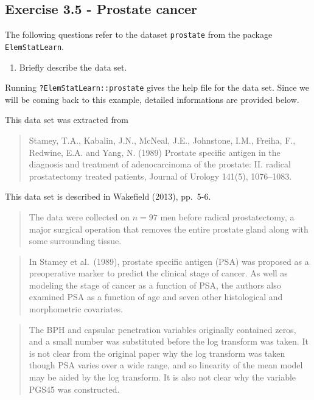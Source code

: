 \documentclass[]{book}
\providecommand{\tightlist}{%
  \setlength{\itemsep}{0pt}\setlength{\parskip}{0pt}}
\theoremstyle{definition}
\theoremstyle{definition}
\theoremstyle{definition}
\theoremstyle{remark}
\begin{document}
\hypertarget{exercise-3.5---prostate-cancer}{%
\subsection{Exercise 3.5 - Prostate
cancer}\label{exercise-3.5---prostate-cancer}}

The following questions refer to the dataset \texttt{prostate} from the
package \texttt{ElemStatLearn}.

\begin{enumerate}
\def\labelenumi{\alph{enumi}.}
\tightlist
\item
  Briefly describe the data set.
\end{enumerate}

Running \texttt{?ElemStatLearn::prostate} gives the help file for the
data set. Since we will be coming back to this example, detailed
informations are provided below.

This data set was extracted from

\begin{quote}
Stamey, T.A., Kabalin, J.N., McNeal, J.E., Johnstone, I.M., Freiha, F.,
Redwine, E.A. and Yang, N. (1989) Prostate specific antigen in the
diagnosis and treatment of adenocarcinoma of the prostate: II. radical
prostatectomy treated patients, Journal of Urology 141(5), 1076--1083.
\end{quote}

This data set is described in Wakefield (2013), pp.~5-6.

\begin{quote}
The data were collected on \(n=97\) men before radical prostatectomy, a
major surgical operation that removes the entire prostate gland along
with some surrounding tissue.
\end{quote}

\begin{quote}
In Stamey et al.~(1989), prostate specific antigen (PSA) was proposed as
a preoperative marker to predict the clinical stage of cancer. As well
as modeling the stage of cancer as a function of PSA, the authors also
examined PSA as a function of age and seven other histological and
morphometric covariates.
\end{quote}

\begin{quote}
The BPH and capsular penetration variables originally contained zeros,
and a small number was substituted before the log transform was taken.
It is not clear from the original paper why the log transform was taken
though PSA varies over a wide range, and so linearity of the mean model
may be aided by the log transform. It is also not clear why the variable
PGS45 was constructed.
\end{quote}
\end{document}
